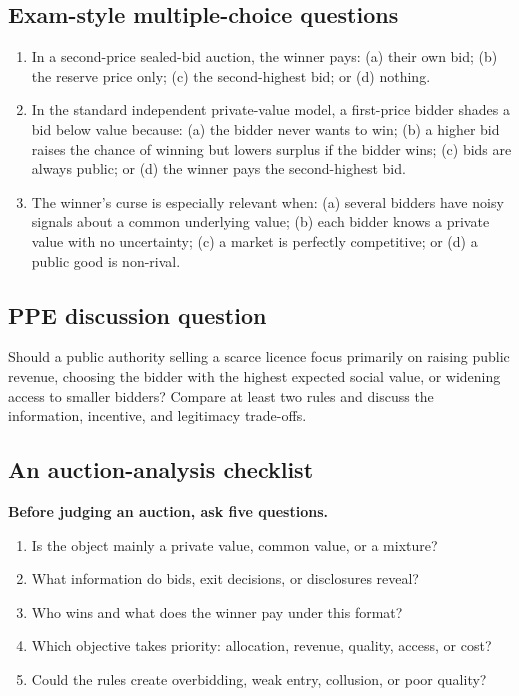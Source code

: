 \subsection*{Exam-style multiple-choice questions}
\begin{enumerate}[resume,label=\arabic*.]
  \item In a second-price sealed-bid auction, the winner pays: (a) their own bid; (b) the reserve price only; (c) the second-highest bid; or (d) nothing.
  \item In the standard independent private-value model, a first-price bidder shades a bid below value because: (a) the bidder never wants to win; (b) a higher bid raises the chance of winning but lowers surplus if the bidder wins; (c) bids are always public; or (d) the winner pays the second-highest bid.
  \item The winner's curse is especially relevant when: (a) several bidders have noisy signals about a common underlying value; (b) each bidder knows a private value with no uncertainty; (c) a market is perfectly competitive; or (d) a public good is non-rival.
\end{enumerate}

\subsection*{PPE discussion question}

\noindent Should a public authority selling a scarce licence focus primarily on
raising public revenue, choosing the bidder with the highest expected social
value, or widening access to smaller bidders? Compare at least two rules and
discuss the information, incentive, and legitimacy trade-offs.

\subsection*{An auction-analysis checklist}

\begin{keyidea}
\textbf{Before judging an auction, ask five questions.}
\begin{enumerate}
  \item Is the object mainly a private value, common value, or a mixture?
  \item What information do bids, exit decisions, or disclosures reveal?
  \item Who wins and what does the winner pay under this format?
  \item Which objective takes priority: allocation, revenue, quality, access, or cost?
  \item Could the rules create overbidding, weak entry, collusion, or poor quality?
\end{enumerate}
\end{keyidea}
